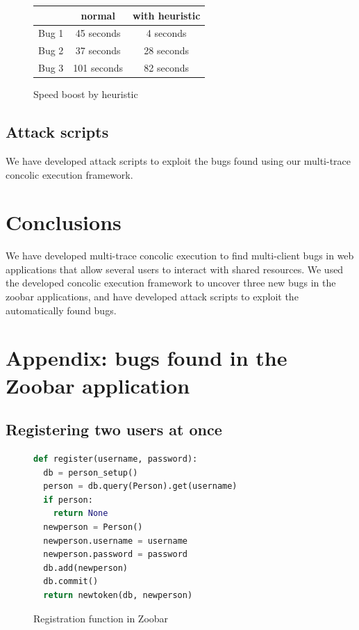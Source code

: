 \documentclass{llncs}
\begin{document}
\begin{figure}
  \begin{center}
    \begin{tabular}{l|c|c}
      \hline
      & normal & with heuristic \\
      \hline
      Bug 1 & 45 seconds & 4 seconds \\
      Bug 2 & 37 seconds & 28 seconds \\
      Bug 3 & 101 seconds & 82 seconds \\
      \hline
    \end{tabular}
  \end{center}
  \caption{Speed boost by heuristic}
  \label{fig:speed}
\end{figure}

\subsection{Attack scripts}

We have developed attack scripts to exploit the bugs found using our
multi-trace concolic execution framework.

\section{Conclusions}

We have developed multi-trace concolic execution to find multi-client
bugs in web applications that allow several users to interact with
shared resources. We used the developed concolic execution framework
to uncover three new bugs in the zoobar applications, and have
developed attack scripts to exploit the automatically found bugs.

\newpage
\appendix

\section{Appendix: bugs found in the Zoobar application}
\label{app:a}

\subsection{Registering two users at once}

\begin{figure}
  \begin{lstlisting}[language=Python]
def register(username, password):
  db = person_setup()
  person = db.query(Person).get(username)
  if person:
    return None
  newperson = Person()
  newperson.username = username
  newperson.password = password
  db.add(newperson)
  db.commit()
  return newtoken(db, newperson)
  \end{lstlisting}
  \caption{Registration function in Zoobar}
  \label{fig:registration}
\end{figure}
\end{document}
